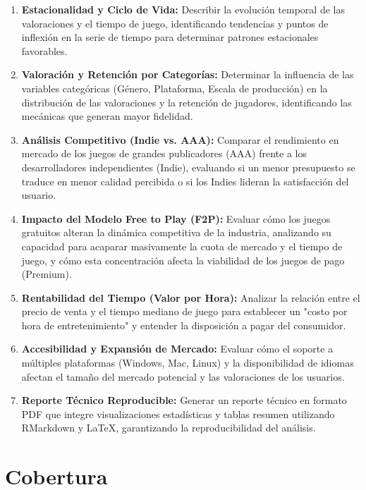 \documentclass[oneside,11pt]{Latex/Classes/PhDthesisPSnPDF}
\begin{document}
\begin{enumerate}
\item \textbf{Estacionalidad y Ciclo de Vida:} Describir la evolución temporal de las valoraciones y el tiempo de juego, identificando tendencias y puntos de inflexión en la serie de tiempo para determinar patrones estacionales favorables.

\item \textbf{Valoración y Retención por Categorías:} Determinar la influencia de las variables categóricas (Género, Plataforma, Escala de producción) en la distribución de las valoraciones y la retención de jugadores, identificando las mecánicas que generan mayor fidelidad.

\item \textbf{Análisis Competitivo (Indie vs. AAA):} Comparar el rendimiento en mercado de los juegos de grandes publicadores (AAA) frente a los desarrolladores independientes (Indie), evaluando si un menor presupuesto se traduce en menor calidad percibida o si los Indies lideran la satisfacción del usuario.

\item \textbf{Impacto del Modelo Free to Play (F2P):} Evaluar cómo los juegos gratuitos alteran la dinámica competitiva de la industria, analizando su capacidad para acaparar masivamente la cuota de mercado y el tiempo de juego, y cómo esta concentración afecta la viabilidad de los juegos de pago (Premium).

\item \textbf{Rentabilidad del Tiempo (Valor por Hora):} Analizar la relación entre el precio de venta y el tiempo mediano de juego para establecer un "costo por hora de entretenimiento" y entender la disposición a pagar del consumidor.

\item \textbf{Accesibilidad y Expansión de Mercado:} Evaluar cómo el soporte a múltiples plataformas (Windows, Mac, Linux) y la disponibilidad de idiomas afectan el tamaño del mercado potencial y las valoraciones de los usuarios.

\item \textbf{Reporte Técnico Reproducible:} Generar un reporte técnico en formato PDF que integre visualizaciones estadísticas y tablas resumen utilizando RMarkdown y LaTeX, garantizando la reproducibilidad del análisis.
\end{enumerate}

\section{Cobertura}
\end{document}
